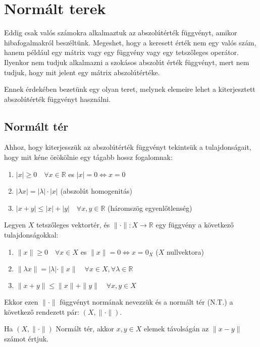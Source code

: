 \chapter{Normált terek}
Eddig csak valós számokra alkalmaztuk az abszolútérték függvényt, amikor hibafogalmakról beszéltünk. Megeshet, hogy a keresett érték nem egy valós szám, hanem például egy mátrix vagy egy függvény vagy egy tetszőleges operátor. Ilyenkor nem tudjuk alkalmazni a szokásos abszolút érték függvényt, mert nem tudjuk, hogy mit jelent egy mátrix abszolútértéke.

Ennek érdekében bezetünk egy olyan teret, melynek elemeire lehet a kiterjesztett abszolútérték függvényt használni.

\section{Normált tér}
Ahhoz, hogy kiterjesszük az abszolútérték függvényt tekintsük a tulajdonságait, hogy mit kéne örökölnie egy tágabb hossz fogalomnak:
\begin{enumerate}
    \item $|x| \geq 0 \quad \forall x \in \mathbb{R}$ es $|x| = 0 \iff x = 0$
    \item $|\lambda x| = |\lambda|\cdot|x|$ (abszolút homogenitás)
    \item $|x + y| \leq |x| + |y| \quad \forall x,y \in \mathbb{R}$ (háromszög egyenlőtlenség)
\end{enumerate}

\begin{definition}
    Legyen $X$ tetszőleges vektortér, és $\| \cdot \|:X \to \mathbb{R}$ egy függvény a következő tulajdonságokkal:
    \begin{enumerate}
        \item $\| x \| \geq 0 \quad \forall x \in X$ es $\| x \| = 0 \iff x = 0_{X}$ ($X$ nullvektora)
        \item $\| \lambda x \| = \lvert \lambda \rvert \cdot \| x \| \quad \forall x \in X, \forall \lambda \in \mathbb{R}$
        \item $\| x + y \| \leq \| x \| + \| y \| \quad \forall x, y \in X$
    \end{enumerate}

Ekkor ezen $\| \cdot \|$ függvényt normának nevezzük és a normált tér (N.T.) a következő rendezett pár: $(X, \| \cdot \|)$.
\end{definition}

\begin{definition}
    Ha $(X, \| \cdot \|)$ Normált tér, akkor $x, y \in X$ elemek távolságán az $\| x-y \|$ számot értjuk.
\end{definition}

